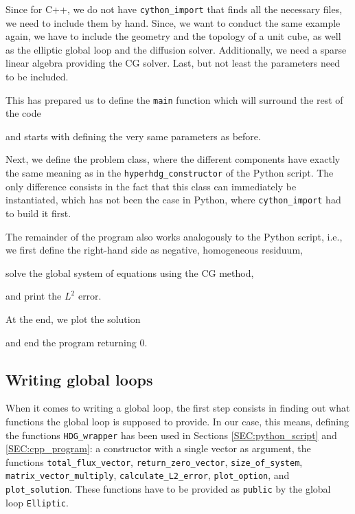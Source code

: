 \documentclass[a4paper, english, 12pt, reqno, draft]{amsart}
\theoremstyle{definition}
\theoremstyle{remark}
\numberwithin{equation}{section}
\newcommand{\code}[1]{\texttt{#1}}
\begin{document}
Since for C++, we do not have \code{cython\_import} that finds all the necessary files, we need to include them by hand. Since, we want to conduct the same example again, we have to include the geometry and the topology of a unit cube, as well as the elliptic global loop and the diffusion solver. Additionally, we need a sparse linear algebra providing the CG solver. Last, but not least the parameters need to be included.
%

%
This has prepared us to define the \code{main} function which will surround the rest of the code
%

%
and starts with defining the very same parameters as before.
%

%
Next, we define the problem class, where the different components have exactly the same meaning as in the \code{hyperhdg\_\-constructor} of the Python script. The only difference consists in the fact that this class can immediately be instantiated, which has not been the case in Python, where \code{cython\_import} had to build it first.
%

%
The remainder of the program also works analogously to the Python script, i.e., we first define the right-hand side as negative, homogeneous residuum,
%

%
solve the global system of equations using the CG method,
%

%
and print the $L^2$ error.
%

%
At the end, we plot the solution
%

%
and end the program returning 0.
%

%
\subsection{Writing global loops}
%
When it comes to writing a global loop, the first step consists in finding out what functions the global loop is supposed to provide. In our case, this means, defining the functions \code{HDG\_wrapper} has been used in Sections \ref{SEC:python_script} and \ref{SEC:cpp_program}: a constructor with a single vector as argument, the functions \code{total\_\-flux\_\-vector}, \code{return\_\-zero\_\-vector}, \code{size\_\-of\_\-system}, \code{matrix\_\-vector\_\-multiply}, \code{calculate\_\-L2\_\-error}, \code{plot\_\-option}, and \code{plot\_\-solution}. These functions have to be provided as \code{public} by the global loop \code{Elliptic}.
\end{document}
